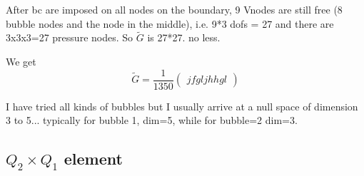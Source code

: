 After bc are imposed on all nodes on the boundary, 
9 Vnodes are still free (8 bubble nodes and the node in the 
middle), i.e. 9*3 dofs = 27 and there are
3x3x3=27 pressure nodes. So $\tilde{G}$ is 27*27. no less. 

We get 
\[
\tilde{G} =
\frac{1}{1350}
\left(
\begin{array}{ccccccccccccccccccccccccccc}
jfg ljh hg l
\end{array}
\right)
\]

I have tried all kinds of bubbles but I usually arrive at a
null space of dimension 3 to 5... typically for bubble 1, dim=5, 
while for bubble=2 dim=3. 


\subsection{$Q_2 \times Q_1$ element}


